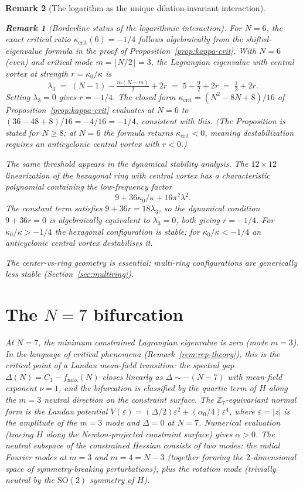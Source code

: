 \documentclass[12pt, a4paper]{article}
\newtheorem{remark}{Remark}[section]
\numberwithin{equation}{section}
\begin{document}
\begin{remark}[The logarithm as the unique dilation-invariant interaction]
\begin{remark}[Borderline status of the logarithmic interaction]
For $N = 6$, the exact critical ratio $\kappa_{\mathrm{crit}}(6) = -1/4$
follows algebraically from the shifted-eigenvalue formula in the proof of
Proposition~\ref{prop:kappa-crit}.  With $N = 6$ (even) and critical mode
$m = \lfloor N/2\rfloor = 3$, the Lagrangian eigenvalue with central vortex
at strength $r = \kappa_0/\kappa$ is
\[
  \lambda_3 \;=\; (N{-}1) - \tfrac{m(N{-}m)}{2} + 2r
  \;=\; 5 - \tfrac{9}{2} + 2r \;=\; \tfrac{1}{2} + 2r.
\]
Setting $\lambda_3 = 0$ gives $r = -1/4$.  The closed form
$\kappa_{\mathrm{crit}} = (N^2{-}8N{+}8)/16$ of
Proposition~\ref{prop:kappa-crit} evaluates at $N = 6$ to
$(36-48+8)/16 = -4/16 = -1/4$, consistent with this.
(The Proposition is stated for $N \ge 8$; at $N = 6$ the formula
returns $\kappa_{\mathrm{crit}} < 0$, meaning destabilization requires
an anticyclonic central vortex with $r < 0$.)

The same threshold appears in the dynamical stability analysis.  The
$12\times 12$ linearization of the hexagonal ring with central vortex
\citep{Havelock1931} has a characteristic polynomial containing the
low-frequency factor
\[
  9 + 36\kappa_0/\kappa + 16\pi^2\lambda^2.
\]
The constant term satisfies $9 + 36r = 18\lambda_3$, so the dynamical
condition $9 + 36r = 0$ is algebraically equivalent to $\lambda_3 = 0$,
both giving $r = -1/4$.  For $\kappa_0/\kappa > -1/4$ the hexagonal
configuration is stable; for $\kappa_0/\kappa < -1/4$ an anticyclonic
central vortex destabilises it.

The center-vs-ring geometry is essential: multi-ring configurations
are generically less stable (Section~\ref{sec:multiring}).


\section{The $N = 7$ bifurcation}
\label{sec:n7-bifurcation}
\label{sec:n7}

At $N = 7$, the minimum constrained Lagrangian eigenvalue is zero
(mode $m = 3$).  In the language of critical phenomena
(Remark~\ref{rem:rep-theory}), this is the critical point of a
Landau mean-field transition: the spectral gap
$\Delta(N) = C_1 - f_{\max}(N)$ closes linearly as
$\Delta \sim -(N{-}7)$ with mean-field exponent $\nu = 1$,
and the bifurcation is classified by the quartic
term of $H$ along the $m = 3$ neutral direction on the constraint
surface.  The $\mathbb{Z}_7$-equivariant normal form is the
Landau potential
$V(\varepsilon) = (\Delta/2)\varepsilon^2 + (\alpha_0/4)\varepsilon^4$,
where $\varepsilon = |z|$ is the amplitude of the $m = 3$ mode
and $\Delta = 0$ at $N = 7$.  Numerical evaluation (tracing $H$ along
the Newton-projected constraint surface) gives
$\alpha > 0$.  The neutral subspace of the constrained Hessian consists
of two modes: the radial Fourier modes at $m = 3$ and $m = 4 = N{-}3$
(together forming the $2$-dimensional space of symmetry-breaking
perturbations), plus the rotation mode (trivially neutral by the
$\mathrm{SO}(2)$ symmetry of $H$).


\end{remark}
\end{remark}
\end{document}
